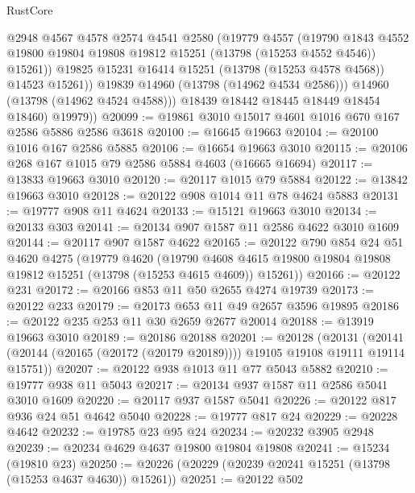 \begin{lexlean}{RustCore}
\begin{coremodule}
                  @2948
                  @4567
                  @4578
                  @2574
                  @4541
                  @2580
                  (@19779
                    @4557
                    (@19790
                      @1843
                      @4552
                      @19800
                      @19804
                      @19808
                      @19812
                      @15251
                      (@13798 (@15253 @4552 @4546))
                      @15261))
                  @19825
                  @15231
                  @16414
                  @15251
                  (@13798 (@15253 @4578 @4568))
                  @14523
                  @15261))
              @19839
              @14960
              (@13798 (@14962 @4534 @2586)))
            @14960
            (@13798 (@14962 @4524 @4588)))
          @18439
          @18442
          @18445
          @18449
          @18454
          @18460)
        @19979))
@20099 := @19861 @3010 @15017 @4601 @1016 @670 @167 @2586 @5886 @2586 @3618
@20100 := @16645 @19663
@20104 := @20100 @1016 @167 @2586 @5885
@20106 := @16654 @19663 @3010
@20115 := @20106 @268 @167 @1015 @79 @2586 @5884 @4603 (@16665 @16694)
@20117 := @13833 @19663 @3010
@20120 := @20117 @1015 @79 @5884
@20122 := @13842 @19663 @3010
@20128 := @20122 @908 @1014 @11 @78 @4624 @5883
@20131 := @19777 @908 @11 @4624
@20133 := @15121 @19663 @3010
@20134 := @20133 @303
@20141 := @20134 @907 @1587 @11 @2586 @4622 @3010 @1609
@20144 := @20117 @907 @1587 @4622
@20165 := @20122
    @790
    @854
    @24
    @51
    @4620
    @4275
    (@19779
      @4620
      (@19790 @4608 @4615 @19800 @19804 @19808 @19812 @15251 (@13798 (@15253 @4615 @4609)) @15261))
@20166 := @20122 @231
@20172 := @20166 @853 @11 @50 @2655 @4274 @19739
@20173 := @20122 @233
@20179 := @20173 @653 @11 @49 @2657 @3596 @19895
@20186 := @20122 @235 @253 @11 @30 @2659 @2677 @20014
@20188 := @13919 @19663 @3010
@20189 := @20186 @20188
@20201 := @20128
    (@20131 (@20141 (@20144 (@20165 (@20172 (@20179 @20189)))) @19105 @19108 @19111 @19114 @15751))
@20207 := @20122 @938 @1013 @11 @77 @5043 @5882
@20210 := @19777 @938 @11 @5043
@20217 := @20134 @937 @1587 @11 @2586 @5041 @3010 @1609
@20220 := @20117 @937 @1587 @5041
@20226 := @20122 @817 @936 @24 @51 @4642 @5040
@20228 := @19777 @817 @24
@20229 := @20228 @4642
@20232 := @19785 @23 @95 @24
@20234 := @20232 @3905 @2948
@20239 := @20234 @4629 @4637 @19800 @19804 @19808
@20241 := @15234 (@19810 @23)
@20250 := @20226 (@20229 (@20239 @20241 @15251 (@13798 (@15253 @4637 @4630)) @15261))
@20251 := @20122 @502

\end{coremodule}
\end{lexlean}
